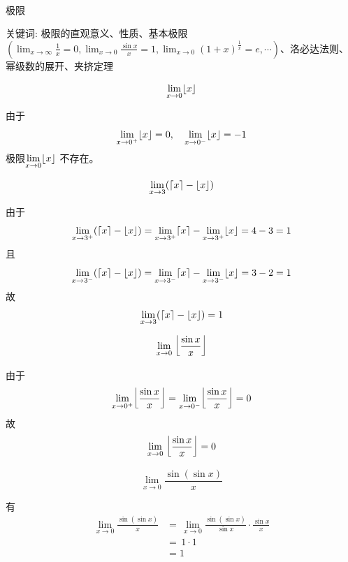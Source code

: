\pagecolor{PageColor}
\
\vfil
\hfil  {\fontsize{50pt}{36pt}\selectfont{微积分}} \hfil
\vfil

\thispagestyle{empty}
\pagebreak
\begin{center}
  {\fontsize{30pt}{26pt}\selectfont
    \hypertarget{极限}{极限} \label{极限}
  }
\end{center}
\separator
\begin{center}
    关键词: 极限的直观意义、性质、基本极限$(\lim_{x \to \infty} \frac{1}{x} = 0,\lim_{x \to 0} \frac{\sin x}{x} = 1,\lim_{x \to 0} (1+x)^{\frac{1}{x}} = e,\cdots)$、洛必达法则、幂级数的展开、夹挤定理
\end{center}
\vspace{0.5pt}
\nopagecolor
\begin{questions}
    \question 
    \[
    \lim_{x \to 0} \lfloor x\rfloor
    \]
    \begin{solution}
        由于
        \[
        \lim_{x \to 0^{+}} \lfloor x\rfloor=0, \quad \lim_{x \to 0^{-}} \lfloor x\rfloor=-1
        \]
        极限$\displaystyle \lim_{x \to 0} \lfloor x\rfloor$ 不存在。
    \end{solution}

    \question 
    \[
    \lim_{x \to 3} (\lceil x\rceil-\lfloor x\rfloor)
    \]
    \begin{solution}
        由于
        \[
        \lim_{x \to 3^{+}} (\lceil x\rceil-\lfloor x\rfloor) = \lim_{x \to 3^{+}} \lceil x\rceil - \lim_{x \to 3^{+}} \lfloor x\rfloor=4-3=1 
        \]
        且
        \[
        \lim_{x \to 3^{-}} (\lceil x\rceil-\lfloor x\rfloor) = \lim_{x \to 3^{-}} \lceil x\rceil - \lim_{x \to 3^{-}} \lfloor x\rfloor=3-2=1 
        \]
        故
        \[
        \lim_{x \to 3} (\lceil x\rceil-\lfloor x\rfloor) =1
        \]
    \end{solution}

    \question 
    \[
    \lim_{x \to 0} \;\floor*{\frac{\sin x }{x}}
    \]
    \begin{solution}
        由于
        \[
        \lim_{x \to 0^{+}} \floor*{\frac{\sin x }{x}} = \lim_{x \to 0^{-}} \floor*{\frac{\sin x }{x}}=0
        \]
        故
        \[
        \lim_{x \to 0} \;\floor*{\frac{\sin x }{x}}=0
        \]
    \end{solution}

    \question 
    \[
    \lim_{x \to 0} \frac{\sin(\sin x)}{x}
    \]
    \begin{solution}
        有
        \begin{align*}
        \lim_{x \to 0} \frac{\sin(\sin x)}{x} 
        &=\,\lim_{x \to 0} \frac{\sin(\sin x)}{\sin x} \cdot \frac{\sin x}{x} \\[2mm]
        &=\,1 \cdot 1 \\
        &= 1
        \end{align*}
    \end{solution}


\end{questions}
